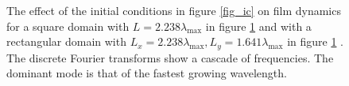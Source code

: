 \documentclass[a4paper,12pt]{article}
\begin{document}
  \begin{figure} 
   \centering
   \caption{The effect of the initial conditions in figure \ref{fig_ic} on film dynamics for a square domain with $L=2.238\lambda_\text{max}$ in figure \ref{fig_domain_size_effect}  and with a rectangular domain with $L_x = 2.238 \lambda_\text{max}, L_y=1.641 \lambda_\text{max}$ in figure \ref{fig_domain_size_effect} . The discrete Fourier transforms show a cascade of frequencies. The dominant mode is that of the fastest growing wavelength.}
   \label{fig_domain_size_effect}
  \end{figure}



\end{document}
